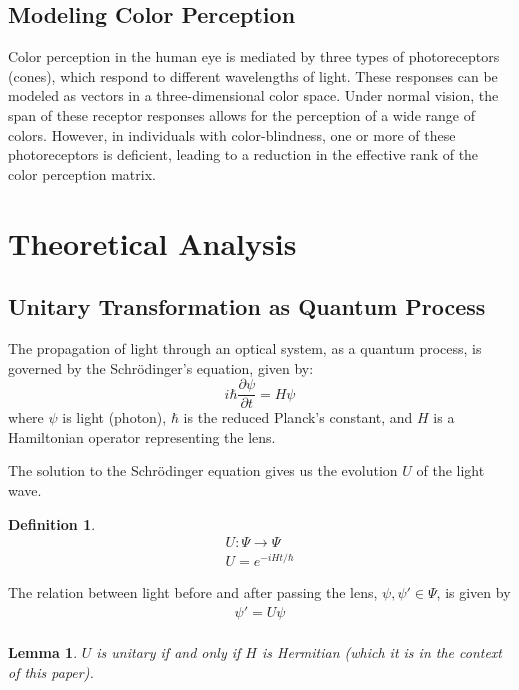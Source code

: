 \documentclass[10pt,a4paper]{article}
\newtheorem{lem}{Lemma}[section]
\theoremstyle{definition}
\newtheorem{defn}{Definition}[section]
\theoremstyle{remark}
\numberwithin{equation}{section}
\begin{document}
\subsection{Modeling Color Perception}
Color perception in the human eye is mediated by three types of photoreceptors (cones), which respond to different wavelengths of light. These responses can be modeled as vectors in a three-dimensional color space. Under normal vision, the span of these receptor responses allows for the perception of a wide range of colors. However, in individuals with color-blindness, one or more of these photoreceptors is deficient, leading to a reduction in the effective rank of the color perception matrix.

\section{Theoretical Analysis}
\subsection{Unitary Transformation as Quantum Process}
The propagation of light through an optical system, as a quantum process, is governed by the Schr\"{o}dinger's equation, given by:
\[
i\hbar \frac{\partial \psi}{\partial t} = H \psi
\]
where \( \psi \) is light (photon), \( \hbar \) is the reduced Planck's constant, and \( H \) is a Hamiltonian operator representing the lens.

The solution to the Schrödinger equation gives us the evolution $U$ of the light wave.
\begin{defn}
\begin{eqnarray}
U:\Psi \rightarrow \Psi\\
U = e^{-iHt/\hbar}
\end{eqnarray}
\end{defn}

The relation between light before and after passing the lens, $\psi,\psi' \in \Psi$, is given by  
\begin{eqnarray}
\psi' = U \psi \\
\end{eqnarray}
\begin{lem}
$U$ is unitary if and only if $H$ is Hermitian (which it is in the context of this paper). 
\end{lem}
\end{document}
